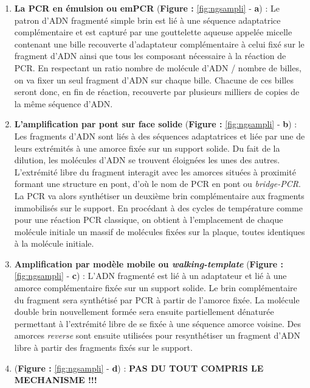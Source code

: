 \documentclass[12pt,twoside]{reedthesis}
\providecommand{\tightlist}{%
  \setlength{\itemsep}{0pt}\setlength{\parskip}{0pt}}
\theoremstyle{definition}
\theoremstyle{definition}
\theoremstyle{remark}
\begin{document}
  \begin{enumerate}
  \def\labelenumi{\arabic{enumi}.}
  \tightlist
  \item
    \textbf{La PCR en émulsion ou emPCR} (\textbf{Figure :
    }\ref{fig:ngsampli} - \textbf{a}) : Le patron d'ADN fragmenté simple
    brin est lié à une séquence adaptatrice complémentaire et est capturé
    par une gouttelette aqueuse appelée micelle contenant une bille
    recouverte d'adaptateur complémentaire à celui fixé sur le fragment
    d'ADN ainsi que tous les composant nécessaire à la réaction de PCR. En
    respectant un ratio nombre de molécule d'ADN / nombre de billes, on va
    fixer un seul fragment d'ADN sur chaque bille. Chacune de ces billes
    seront donc, en fin de réaction, recouverte par plusieurs milliers de
    copies de la même séquence d'ADN.\\
  \item
    \textbf{L'amplification par pont sur face solide} (\textbf{Figure :
    }\ref{fig:ngsampli} - \textbf{b}) : Les fragments d'ADN sont liés à
    des séquences adaptatrices et liée par une de leurs extrémités à une
    amorce fixée sur un support solide. Du fait de la dilution, les
    molécules d'ADN se trouvent éloignées les unes des autres. L'extrémité
    libre du fragment interagit avec les amorces situées à proximité
    formant une structure en pont, d'où le nom de PCR en pont ou
    \emph{bridge-PCR}. La PCR va alors synthétiser un deuxième brin
    complémentaire aux fragments immobilisés sur le support. En procédant
    à des cycles de température comme pour une réaction PCR classique, on
    obtient à l'emplacement de chaque molécule initiale un massif de
    molécules fixées sur la plaque, toutes identiques à la molécule
    initiale.\\
  \item
    \textbf{Amplification par modèle mobile ou \emph{walking-template}
    }(\textbf{Figure : }\ref{fig:ngsampli} - \textbf{c}) : L'ADN fragmenté
    est lié à un adaptateur et lié à une amorce complémentaire fixée sur
    un support solide. Le brin complémentaire du fragment sera synthétisé
    par PCR à partir de l'amorce fixée. La molécule double brin
    nouvellement formée sera ensuite partiellement dénaturée permettant à
    l'extrémité libre de se fixée à une séquence amorce voisine. Des
    amorces \emph{reverse} sont ensuite utilisées pour resynthétiser un
    fragment d'ADN libre à partir des fragments fixés sur le support.\\
  \item
    (\textbf{Figure : }\ref{fig:ngsampli} - \textbf{d}) : \textbf{PAS DU
    TOUT COMPRIS LE MECHANISME !!! }
  \end{enumerate}
  
\end{document}
